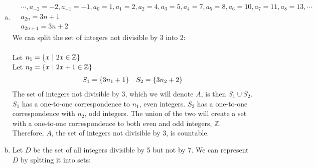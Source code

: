 \documentclass[article,12pt]{article}
\DeclarePairedDelimiter\set{\{}{\}}
\newcommand{\unite}{\cup}
\newcommand{\ints}{\mathbb{Z}}
\begin{document}
\begin{enumerate}[(a)]
    \item 
    \begin{align*}
       &\cdots, a_{-2} = -2, a_{-1} = -1, a_0 = 1, a_1 = 2, a_2 = 4, a_3 = 5, a_4 = 7, a_5 = 8, a_6 = 10, a_7 = 11, a_8 = 13, \cdots\\
        &a_{2n} = 3n + 1 \\ 
        &a_{2n + 1} = 3n + 2
    \end{align*}
    We can split the set of integers not divisible by 3 into 2: \\  
    \\
    Let $n_1 = \set*{x \ | \ 2x \in \ints}$ \\
    Let $n_2 = \set*{x \ | \ 2x + 1 \in \ints}$
    \begin{align*}
        S_1 = \set*{3n_1 + 1} && S_2 = \set*{3n_2 + 2}
    \end{align*}
    The set of integers not divisible by 3, which we will denote $A$, is then $S_1 \unite S_2$. $S_1$ has a one-to-one correspondence to $n_1$, even integers. $S_2$ has a one-to-one correspondence with $n_2$, odd integers. The union of the two will create a set with a one-to-one correspondence to both even and odd integers, $\ints$. Therefore, $A$, the set of integers not divisible by 3, is countable.
    \item 
        Let $D$ be the set of all integers divisible by 5 but not by 7. We can represent $D$ by spltting it into sets: \\


\end{enumerate}
\end{document}
